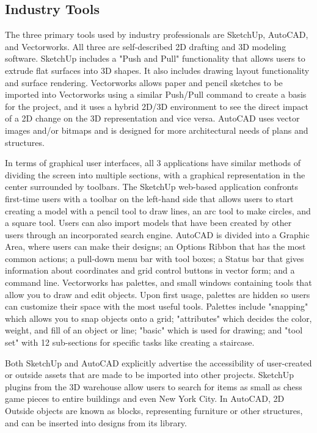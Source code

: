 \documentclass[10pt,twocolumn]{article}
\begin{document}
\subsection{Industry Tools}
The three primary tools used by industry professionals are SketchUp, AutoCAD, and Vectorworks. All three are self-described 2D drafting and 3D modeling software. SketchUp includes a "Push and Pull" functionality that allows users to extrude flat surfaces into 3D shapes. It also includes drawing layout functionality and surface rendering. Vectorworks allows paper and pencil sketches to be imported into Vectorworks using a similar Push/Pull command to create a basis for the project, and it uses a hybrid 2D/3D environment to see the direct impact of a 2D change on the 3D representation and vice versa. AutoCAD uses vector images and/or bitmaps and is designed for more architectural needs of plans and structures. 

In terms of graphical user interfaces, all 3 applications have similar methods of dividing the screen into multiple sections, with a graphical representation in the center surrounded by toolbars. The SketchUp web-based application confronts first-time users with a toolbar on the left-hand side that allows users to start creating a model with a pencil tool to draw lines, an arc tool to make circles, and a square tool. Users can also import models that have been created by other users through an incorporated search engine. AutoCAD is divided into a Graphic Area, where users can make their designs; an Options Ribbon that has the most common actions; a pull-down menu bar with tool boxes; a Status bar that gives information about coordinates and grid control buttons in vector form; and a command line. Vectorworks has palettes, and small windows containing tools that allow you to draw and edit objects. Upon first usage, palettes are hidden so users can customize their space with the most useful tools. Palettes include "snapping" which allows you to snap objects onto a grid; "attributes" which decides the color, weight, and fill of an object or line; "basic" which is used for drawing; and "tool set" with 12 sub-sections for specific tasks like creating a staircase.

Both SketchUp and AutoCAD explicitly advertise the accessibility of user-created or outside assets that are made to be imported into other projects. SketchUp plugins from the 3D warehouse allow users to search for items as small as chess game pieces to entire buildings and even New York City. In AutoCAD, 2D Outside objects are known as blocks, representing furniture or other structures, and can be inserted into designs from its library.
\end{document}
